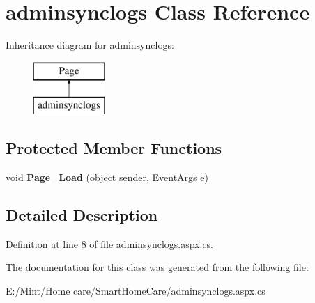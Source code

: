 \hypertarget{classadminsynclogs}{\section{adminsynclogs Class Reference}
\label{classadminsynclogs}
}
Inheritance diagram for adminsynclogs\-:\begin{figure}[H]
\begin{center}
\leavevmode
\includegraphics[height=2.000000cm]{classadminsynclogs}
\end{center}
\end{figure}
\subsection*{Protected Member Functions}
\begin{DoxyCompactItemize}
\item 
\hypertarget{classadminsynclogs_a5d2623b0a8c872c7bbe68dbaab7ee45b}{void {\bfseries Page\-\_\-\-Load} (object sender, Event\-Args e)}\label{classadminsynclogs_a5d2623b0a8c872c7bbe68dbaab7ee45b}

\end{DoxyCompactItemize}


\subsection{Detailed Description}


Definition at line 8 of file adminsynclogs.\-aspx.\-cs.



The documentation for this class was generated from the following file\-:\begin{DoxyCompactItemize}
\item 
E\-:/\-Mint/\-Home care/\-Smart\-Home\-Care/adminsynclogs.\-aspx.\-cs\end{DoxyCompactItemize}
